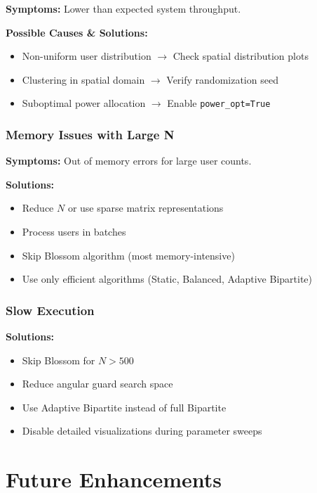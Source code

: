 \documentclass[12pt,a4paper]{article}
\newcommand{\code}[1]{\texttt{#1}}
\begin{document}
\textbf{Symptoms:} Lower than expected system throughput.

\textbf{Possible Causes \& Solutions:}
\begin{itemize}
    \item Non-uniform user distribution $\rightarrow$ Check spatial distribution plots
    \item Clustering in spatial domain $\rightarrow$ Verify randomization seed
    \item Suboptimal power allocation $\rightarrow$ Enable \code{power\_opt=True}
\end{itemize}

\subsubsection{Memory Issues with Large N}

\textbf{Symptoms:} Out of memory errors for large user counts.

\textbf{Solutions:}
\begin{itemize}
    \item Reduce $N$ or use sparse matrix representations
    \item Process users in batches
    \item Skip Blossom algorithm (most memory-intensive)
    \item Use only efficient algorithms (Static, Balanced, Adaptive Bipartite)
\end{itemize}

\subsubsection{Slow Execution}

\textbf{Solutions:}
\begin{itemize}
    \item Skip Blossom for $N > 500$
    \item Reduce angular guard search space
    \item Use Adaptive Bipartite instead of full Bipartite
    \item Disable detailed visualizations during parameter sweeps
\end{itemize}

\section{Future Enhancements}
\end{document}
